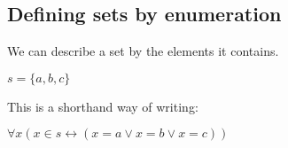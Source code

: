 
\subsection{Defining sets by enumeration}

We can describe a set by the elements it contains.

\(s=\{a,b,c\}\)

This is a shorthand way of writing:

\(\forall x (x\in s \leftrightarrow (x=a\lor x=b \lor x=c))\)


